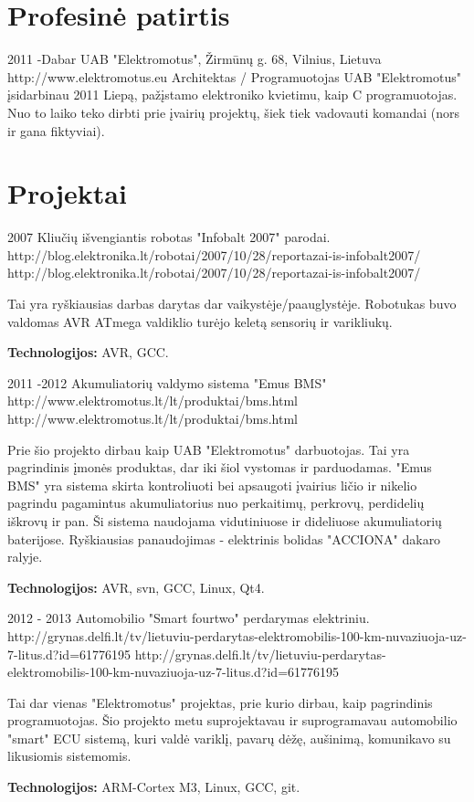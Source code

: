 \documentclass[12]{article}
\begin{document}

\section{Profesinė patirtis}

\job
{2011 -}{Dabar}
{UAB "Elektromotus", Žirmūnų g. 68, Vilnius, Lietuva}
{http://www.elektromotus.eu}
{Architektas / Programuotojas}
{
UAB "Elektromotus" įsidarbinau 2011 Liepą, pažįstamo elektroniko kvietimu, kaip C programuotojas.
Nuo to laiko teko dirbti prie įvairių projektų, šiek tiek vadovauti komandai (nors ir gana fiktyviai).
}


\section{Projektai}

\job
{2007}{}
{Kliučių išvengiantis robotas "Infobalt 2007" parodai.}
{http://blog.elektronika.lt/robotai/2007/10/28/reportazai-is-infobalt2007/}
{http://blog.elektronika.lt/robotai/2007/10/28/reportazai-is-infobalt2007/}
{Tai yra ryškiausias darbas darytas dar vaikystėje/paauglystėje.
Robotukas buvo valdomas AVR ATmega valdiklio turėjo keletą sensorių ir varikliukų.\\
\rule{0mm}{5mm}\textbf{Technologijos:} AVR, GCC.}


\job
{2011 -}{2012}
{Akumuliatorių valdymo sistema "Emus BMS"}
{http://www.elektromotus.lt/lt/produktai/bms.html}
{http://www.elektromotus.lt/lt/produktai/bms.html}
{Prie šio projekto dirbau kaip UAB "Elektromotus" darbuotojas. Tai yra pagrindinis įmonės produktas, dar iki šiol vystomas ir parduodamas.
"Emus BMS" yra sistema skirta kontroliuoti bei apsaugoti įvairius ličio ir nikelio pagrindu pagamintus akumuliatorius nuo perkaitimų, perkrovų, perdidelių iškrovų ir pan.
Ši sistema naudojama vidutiniuose ir dideliuose akumuliatorių baterijose.
Ryškiausias panaudojimas - elektrinis bolidas "ACCIONA" dakaro ralyje.\\
\rule{0mm}{5mm}\textbf{Technologijos:} AVR, svn, GCC, Linux, Qt4.}

\job
{2012 - }{2013}
{Automobilio "Smart fourtwo" perdarymas elektriniu.}
{http://grynas.delfi.lt/tv/lietuviu-perdarytas-elektromobilis-100-km-nuvaziuoja-uz-7-litus.d?id=61776195}
{http://grynas.delfi.lt/tv/lietuviu-perdarytas-elektromobilis-100-km-nuvaziuoja-uz-7-litus.d?id=61776195}
{Tai dar vienas "Elektromotus" projektas, prie kurio dirbau, kaip pagrindinis programuotojas.
Šio projekto metu suprojektavau ir suprogramavau automobilio "smart" ECU sistemą, kuri valdė
variklį, pavarų dėžę, aušinimą, komunikavo su likusiomis sistemomis.\\
\rule{0mm}{5mm}\textbf{Technologijos:} ARM-Cortex M3, Linux, GCC, git.}
\end{document}
